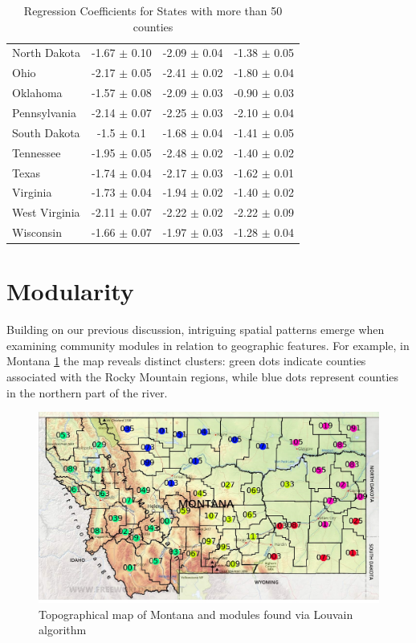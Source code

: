 \begin{table}[H]
\begin{tabular}{lccc}
        North Dakota & -1.67 $\pm$ 0.10 & -2.09 $\pm$ 0.04 & -1.38 $\pm$ 0.05 \\
        Ohio & -2.17 $\pm$ 0.05 & -2.41 $\pm$ 0.02 & -1.80 $\pm$ 0.04 \\
        Oklahoma & -1.57 $\pm$ 0.08 & -2.09 $\pm$ 0.03 & -0.90 $\pm$ 0.03 \\
        Pennsylvania & -2.14 $\pm$ 0.07 & -2.25 $\pm$ 0.03 & -2.10 $\pm$ 0.04 \\
        South Dakota & -1.5 $\pm$ 0.1 & -1.68 $\pm$ 0.04 & -1.41 $\pm$ 0.05 \\
        Tennessee & -1.95 $\pm$ 0.05 & -2.48 $\pm$ 0.02 & -1.40 $\pm$ 0.02 \\
        Texas & -1.74 $\pm$ 0.04 & -2.17 $\pm$ 0.03 & -1.62 $\pm$ 0.01 \\
        Virginia & -1.73 $\pm$ 0.04 & -1.94 $\pm$ 0.02 & -1.40 $\pm$ 0.02 \\
        West Virginia & -2.11 $\pm$ 0.07 & -2.22 $\pm$ 0.02 & -2.22 $\pm$ 0.09 \\
        Wisconsin & -1.66 $\pm$ 0.07 & -1.97 $\pm$ 0.03 & -1.28 $\pm$ 0.04 \\
        \hline
    \end{tabular}
    \caption{Regression Coefficients for States with more than 50 counties}
    \label{tab:elasticity_results}
\end{table}

\section{Modularity}

Building on our previous discussion, intriguing spatial patterns emerge when examining community modules in relation to geographic features. For example, in Montana \ref{fig:Montana_modularity} the map reveals distinct clusters: green dots indicate counties associated with the Rocky Mountain regions, while blue dots represent counties in the northern part of the river.
\begin{figure}
    \centering
    \includegraphics[width=\linewidth]{images/montana_superimposed.jpg}
    \caption{Topographical map of Montana and modules found via Louvain algorithm}
    \label{fig:Montana_modularity}
\end{figure}

